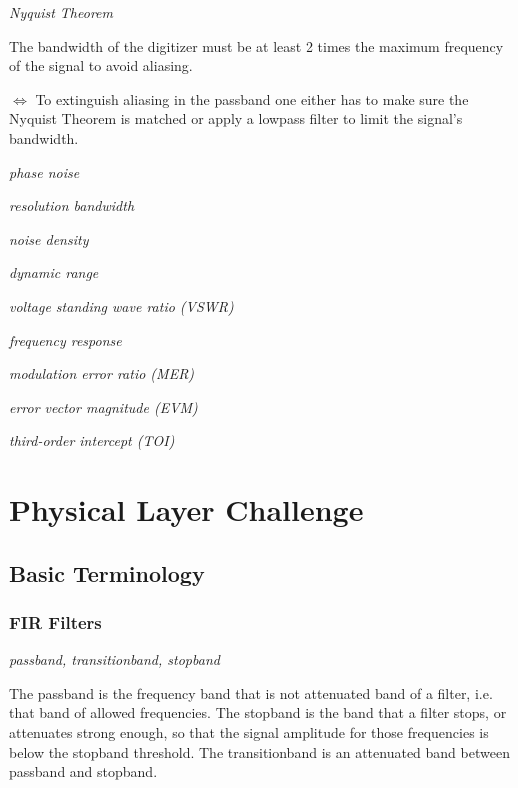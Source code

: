 \documentclass{article}
\begin{document}
\emph{Nyquist Theorem}

The bandwidth of the digitizer must be at least 2 times the maximum frequency of the signal to avoid aliasing. 

\medskip

$\Leftrightarrow$ To extinguish aliasing in the passband one either has to make sure the Nyquist Theorem is matched or apply a lowpass filter to limit the signal's bandwidth.

\bigskip

\emph{phase noise}

\bigskip

\emph{resolution bandwidth}

\bigskip

\emph{noise density}

\bigskip

\emph{dynamic range}

\bigskip

\emph{voltage standing wave ratio (VSWR)}

\bigskip

\emph{frequency response}

\bigskip
 
\emph{modulation error ratio (MER)}

\bigskip

\emph{error vector magnitude (EVM)}

\bigskip

\emph{third-order intercept (TOI)}

\section{Physical Layer Challenge}

\subsection{Basic Terminology}

\subsubsection{FIR Filters}

\emph{passband, transitionband, stopband}

The passband is the frequency band that is not attenuated band of a filter, i.e. that band of allowed frequencies. The stopband is the band that a filter stops, or attenuates strong enough, so that the signal amplitude for those frequencies is below the stopband threshold. The transitionband is an attenuated band between passband and stopband.  
\end{document}
